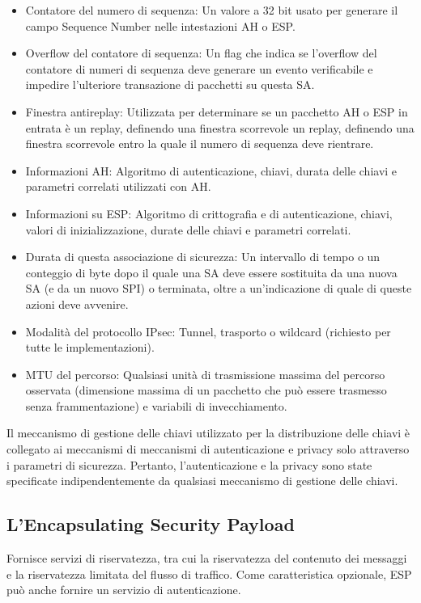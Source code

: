 \begin{itemize}
    \item Contatore del numero di sequenza: Un valore a 32 bit usato per generare il campo Sequence Number nelle intestazioni AH o ESP.
    
    \item Overflow del contatore di sequenza: Un flag che indica se l'overflow del contatore di numeri di sequenza deve generare un evento verificabile e impedire l'ulteriore transazione di pacchetti su questa SA.
    
    \item Finestra antireplay: Utilizzata per determinare se un pacchetto AH o ESP in entrata è un replay, definendo una finestra scorrevole un replay, definendo una finestra scorrevole entro la quale il numero di sequenza deve rientrare.
    
    \item Informazioni AH: Algoritmo di autenticazione, chiavi, durata delle chiavi e parametri correlati utilizzati con AH.
    
    \item Informazioni su ESP: Algoritmo di crittografia e di autenticazione, chiavi, valori di inizializzazione, durate delle chiavi e parametri correlati.
    
    \item Durata di questa associazione di sicurezza: Un intervallo di tempo o un conteggio di byte dopo il quale una SA deve essere sostituita da una nuova SA (e da un nuovo SPI) o terminata, oltre a un'indicazione di quale di queste azioni deve avvenire.
    
    \item Modalità del protocollo IPsec: Tunnel, trasporto o wildcard (richiesto per tutte le implementazioni).
    
    \item MTU del percorso: Qualsiasi unità di trasmissione massima del percorso osservata (dimensione massima di un pacchetto che può essere trasmesso senza frammentazione) e variabili di invecchiamento.
\end{itemize}
Il meccanismo di gestione delle chiavi utilizzato per la distribuzione delle chiavi è collegato ai meccanismi di
meccanismi di autenticazione e privacy solo attraverso i parametri di sicurezza. Pertanto, l'autenticazione e la privacy sono state specificate indipendentemente da qualsiasi meccanismo di gestione delle chiavi.

\subsection{L'Encapsulating Security Payload}
Fornisce servizi di riservatezza, tra cui la riservatezza del contenuto dei messaggi e la riservatezza limitata del flusso di traffico. Come caratteristica opzionale, ESP può anche fornire un servizio di autenticazione. 


